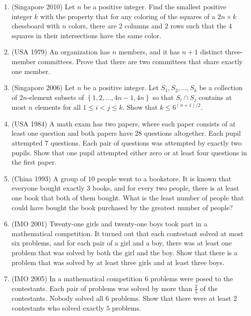 \documentclass[11pt,paper=letter]{scrartcl}
\begin{document}
\begin{enumerate}[resume]

\item (Singapore 2010) Let $n$ be a positive integer. Find the smallest positive integer $k$ with the property that for any coloring of the squares of a $2n \times k$ chessboard with $n$ colors, there are $2$ columns and $2$ rows such that the $4$ squares in their intersections have the same color. \hint{\ref{h:4}}

\item (USA 1979) An organization has $n$ members, and it has $n + 1$ distinct three-member committees. Prove that there are two committees that share exactly one member. \hint{\ref{h:5}}

\item (Singapore 2006) Let $n$ be a positive integer. Let $S_1, S_2, \ldots, S_k$ be a collection of $2n$-element subsets of $ \left\{ 1, 2, \ldots, 4n -1, 4n \right\} $ so that $S_i \cap S_j$ contains at most $n$ elements for all $1 \le i < j \le k$. Show that $k \le 6^{(n+1)/2} $. \hint{\ref{h:6}}

\item (USA 1984) A math exam has two papers, where each paper consists of at least one question and both papers have $28$ questions altogether. Each pupil attempted $7$ questions. Each pair of questions was attempted by exactly two pupils. Show that one pupil attempted either zero or at least four questions in the first paper. \hint{\ref{h:7}}

\item (China 1993) A group of $10$ people went to a bookstore. It is known that everyone bought exactly $3$ books, and for every two people, there is at least one book that both of them bought. What is the least number of people that could have bought the book purchased by the greatest number of people? \hint{\ref{h:8}}


\item (IMO 2001) Twenty-one girls and twenty-one boys took part in a mathematical competition. It turned out that each contestant solved at most six problems, and for each pair of a girl and a boy, there was at least one problem that was solved by both the girl and the boy. Show that there is a problem that was solved by at least three girls and at least three boys. \hint{\ref{h:9}}

\item (IMO 2005) In a mathematical competition $6$ problems were posed to the contestants. Each pair of problems was solved by more than $\frac25$ of the contestants. Nobody solved all $6$ problems. Show that there were at least $2$ contestants who solved exactly $5$ problems.

\end{enumerate}
\end{document}
